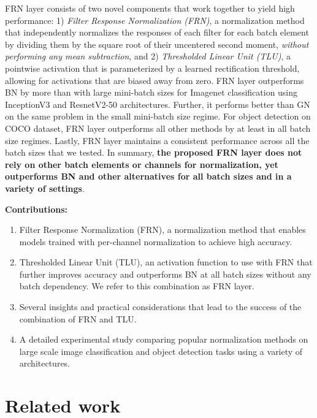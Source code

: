\documentclass[10pt,twocolumn,letterpaper]{article}
\newcommand{\orelu}{TLU}
\newcommand{\papername}{FRN}
\newcommand{\batchnorm}{BN}
\newcommand{\momentnorm}{FRN}
\begin{document}
\papername{} layer consists of two novel components that work together to yield high performance: 1) \emph{Filter Response Normalization (\papername{})}, a normalization method that independently normalizes the responses of each filter for each batch element by dividing them by the square root of their uncentered second moment, \emph{without performing any mean subtraction}, and 2) \emph{Thresholded Linear Unit (\orelu{})}, a pointwise activation that is parameterized by a learned rectification threshold, allowing for activations that are biased away from zero. \papername{} layer outperforms \batchnorm{} by more than  with large mini-batch sizes for Imagenet classification using InceptionV3 and ResnetV2-50 architectures. Further, it performs  better than GN on the same problem in the small mini-batch size regime. For object detection on COCO dataset, \papername{} layer outperforms all other methods by at least  in all batch size regimes. Lastly, \papername{} layer maintains a consistent performance across all the batch sizes that we tested. In summary, \textbf{the proposed \papername{} layer does not rely on other batch elements or channels for normalization, yet outperforms \batchnorm{} and other alternatives for all batch sizes and in a variety of settings}.

\medskip
\noindent
\textbf{Contributions: }

\begin{enumerate}[leftmargin=*,noitemsep]
\item Filter Response Normalization (FRN), a normalization method that enables models trained with per-channel normalization to achieve high accuracy.
\item Thresholded Linear Unit (TLU), an activation function to use with FRN that further improves accuracy and outperforms \batchnorm{} at all batch sizes without any batch dependency. We refer to this combination as \papername{} layer.
\item Several insights and practical considerations that lead to the success of the combination of \momentnorm{} and \orelu{}.
\item A detailed experimental study comparing popular normalization methods on large scale image classification and object detection tasks using a variety of architectures.
\end{enumerate}



\section{Related work}
\end{document}
